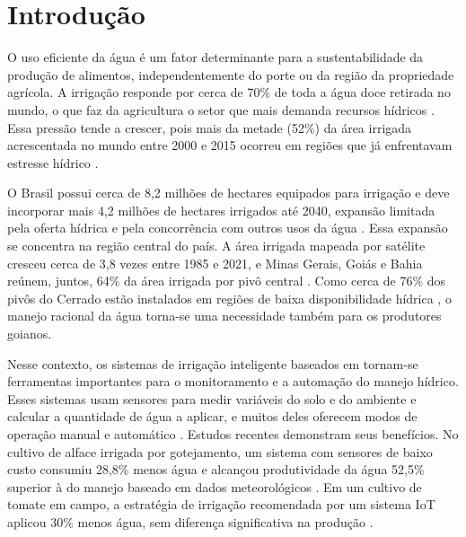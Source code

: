 \chapter{Introdução}
\label{textuais/introducao}

O uso eficiente da água é um fator determinante para a sustentabilidade da produção de alimentos, independentemente do porte ou da região da propriedade agrícola. A irrigação responde por cerca de 70\% de toda a água doce retirada no mundo, o que faz da agricultura o setor que mais demanda recursos hídricos \cite{mcdermid2023}. Essa pressão tende a crescer, pois mais da metade (52\%) da área irrigada acrescentada no mundo entre 2000 e 2015 ocorreu em regiões que já enfrentavam estresse hídrico \cite{mehta2024}.

O Brasil possui cerca de 8,2 milhões de hectares equipados para irrigação e deve incorporar mais 4,2 milhões de hectares irrigados até 2040, expansão limitada pela oferta hídrica e pela concorrência com outros usos da água \cite{ana2021atlas}. Essa expansão se concentra na região central do país. A área irrigada mapeada por satélite cresceu cerca de 3,8 vezes entre 1985 e 2021, e Minas Gerais, Goiás e Bahia reúnem, juntos, 64\% da área irrigada por pivô central \cite{mapbiomas2022irrigacao}. Como cerca de 76\% dos pivôs do Cerrado estão instalados em regiões de baixa disponibilidade hídrica \cite{sano2024}, o manejo racional da água torna-se uma necessidade também para os produtores goianos.

Nesse contexto, os sistemas de irrigação inteligente baseados em  tornam-se ferramentas importantes para o monitoramento e a automação do manejo hídrico. Esses sistemas usam sensores para medir variáveis do solo e do ambiente e calcular a quantidade de água a aplicar, e muitos deles oferecem modos de operação manual e automático \cite{garcia2020iot}. Estudos recentes demonstram seus benefícios. No cultivo de alface irrigada por gotejamento, um sistema com sensores de baixo custo consumiu 28,8\% menos água e alcançou produtividade da água 52,5\% superior à do manejo baseado em dados meteorológicos \cite{abdelmoneim2025comparative}. Em um cultivo de tomate em campo, a estratégia de irrigação recomendada por um sistema IoT aplicou 30\% menos água, sem diferença significativa na produção \cite{dong2024implementation}.

